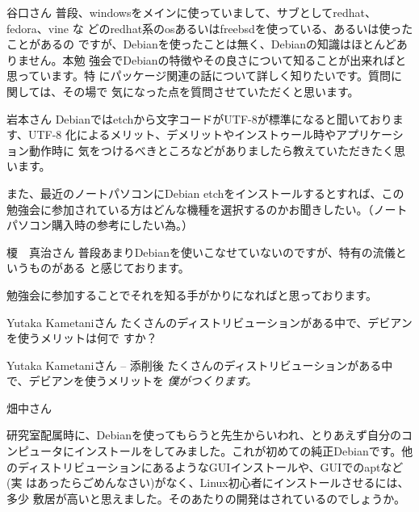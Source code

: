 \documentclass[cjk,dvipdfmx]{beamer}
\begin{document}
\begin{frame}{谷口さん}
普段、windowsをメインに使っていまして、サブとしてredhat、fedora、vine な
どのredhat系のosあるいはfreebsdを使っている、あるいは使ったことがあるの
ですが、Debianを使ったことは無く、Debianの知識はほとんどありません。本勉
強会でDebianの特徴やその良さについて知ることが出来ればと思っています。特
にパッケージ関連の話について詳しく知りたいです。質問に関しては、その場で
気になった点を質問させていただくと思います。
\end{frame}

\begin{frame}{岩本さん}
Debianではetchから文字コードがUTF-8が標準になると聞いております、UTF-8 
化によるメリット、デメリットやインストゥール時やアプリケーション動作時に
気をつけるべきところなどがありましたら教えていただきたく思います。

また、最近のノートパソコンにDebian etchをインストールするとすれば、この
勉強会に参加されている方はどんな機種を選択するのかお聞きしたい。（ノート
パソコン購入時の参考にしたい為。）
\end{frame}

\begin{frame}{榎　真治さん}
普段あまりDebianを使いこなせていないのですが、特有の流儀というものがある
と感じております。

勉強会に参加することでそれを知る手がかりになればと思っております。
\end{frame}

\begin{frame}{Yutaka Kametaniさん}
たくさんのディストリビューションがある中で、デビアンを使うメリットは何で
すか？
\end{frame}

\begin{frame}{Yutaka Kametaniさん -- 添削後}
たくさんのディストリビューションがある中で、デビアンを使うメリットを{\em
 僕がつくります。}
\end{frame}



\begin{frame}{畑中さん}

研究室配属時に、Debianを使ってもらうと先生からいわれ、とりあえず自分のコ
ンピュータにインストールをしてみました。これが初めての純正Debianです。他
のディストリビューションにあるようなGUIインストールや、GUIでのaptなど(実
はあったらごめんなさい)がなく、Linux初心者にインストールさせるには、多少
敷居が高いと思えました。そのあたりの開発はされているのでしょうか。

\end{frame}
\end{document}
